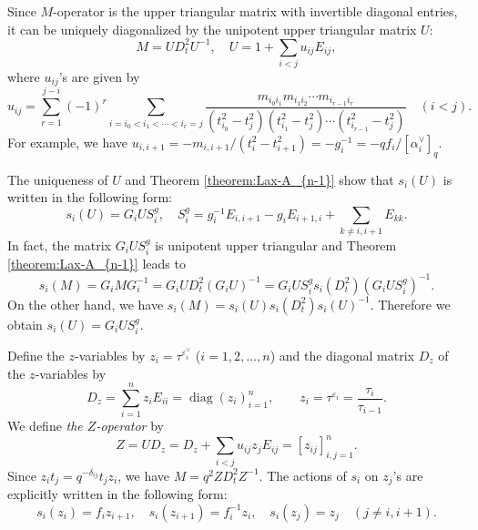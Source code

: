\documentclass[12pt,twoside]{article}
\newcommand\av{\alpha^\vee}
\newcommand\eps{\varepsilon}
\newcommand\epsv{\eps^\vee}
\newcommand\diag{\mathop{\mathrm{diag}}\nolimits}
\theoremstyle{plain} %
\theoremstyle{definition} %
\theoremstyle{definition} %
\numberwithin{theorem}{section}
\numberwithin{equation}{section}
\numberwithin{figure}{section}
\numberwithin{table}{section}
\newcommand\theoremref[1]{Theorem \ref{#1}}
\begin{document}
Since $M$-operator is the upper triangular matrix with
invertible diagonal entries, 
it can be uniquely diagonalized 
by the unipotent upper triangular matrix $U$:
\begin{equation*}
 M = U D_t^2 U^{-1}, \quad
 U = 1 + \sum_{i<j} u_{ij} E_{ij},
\end{equation*}
where $u_{ij}$'s are given by
\begin{equation*}
 u_{ij} 
 = \sum_{r=1}^{j-i}(-1)^r
   \sum_{i=i_0<i_1<\cdots<i_r=j}
   \frac{m_{i_0i_1}m_{i_1i_2}\cdots m_{i_{r-1}i_r}}
        {(t_{i_0}^2-t_j^2)(t_{i_1}^2-t_j^2)\cdots(t_{i_{r-1}}^2-t_j^2)}
 \quad (i<j).
\end{equation*}
For example, we have 
$u_{i,i+1} = -m_{i,i+1}/(t_i^2-t_{i+1}^2)=-g_i^{-1} = - qf_i/[\av_i]_q$. 

The uniqueness of $U$ and \theoremref{theorem:Lax-A_{n-1}} show that
$s_i(U)$ is written in the following form:
\begin{equation}
 s_i(U) = G_i U S_i^g, \quad
 S_i^g = g_i^{-1} E_{i,i+1} - g_i E_{i+1,i} + \sum_{k\ne i,i+1} E_{kk}.
 \label{eq:s_i(U)}
\end{equation}
In fact, the matrix $G_i U S_i^g$ is unipotent upper triangular 
and \theoremref{theorem:Lax-A_{n-1}} leads to
\begin{equation*}
 s_i(M) 
 = G_i M G_i^{-1}
 = G_i U D_t^2 (G_i U)^{-1}
 = G_i U S_i^g s_i(D_t^2) (G_i U S_i^g)^{-1}.
\end{equation*}
On the other hand, we have $s_i(M)=s_i(U)s_i(D_t^2)s_i(U)^{-1}$.
Therefore we obtain $s_i(U)=G_i U S_i^g$.

Define the $z$-variables by $z_i = \tau^{\epsv_i}$ ($i=1,2,\ldots,n$) 
and the diagonal matrix $D_z$ of the $z$-variables by
\begin{equation*}
 D_z = \sum_{i=1}^n z_i E_{ii} = \diag(z_i)_{i=1}^n,
 \qquad z_i = \tau^{\eps_i} = \frac{\tau_i}{\tau_{i-1}}.
\end{equation*}
We define {\em the $Z$-operator} by
\begin{equation*}
 Z = U D_z = D_z + \sum_{i<j} u_{ij}z_j E_{ij} = [z_{ij}]_{i,j=1}^n.
\end{equation*}
Since $z_i t_j = q^{-\delta_{ij}} t_j z_i$, 
we have $M = q^2 Z D_t^2 Z^{-1}$. 
The actions of $s_i$ on $z_j$'s are explicitly written in the following form:
\begin{equation*}
 s_i(z_i)= f_i z_{i+1}, \quad
 s_i(z_{i+1}) = f_i^{-1} z_i, \quad
 s_i(z_j) = z_j \quad (j\ne i,i+1).
\end{equation*}
\end{document}
